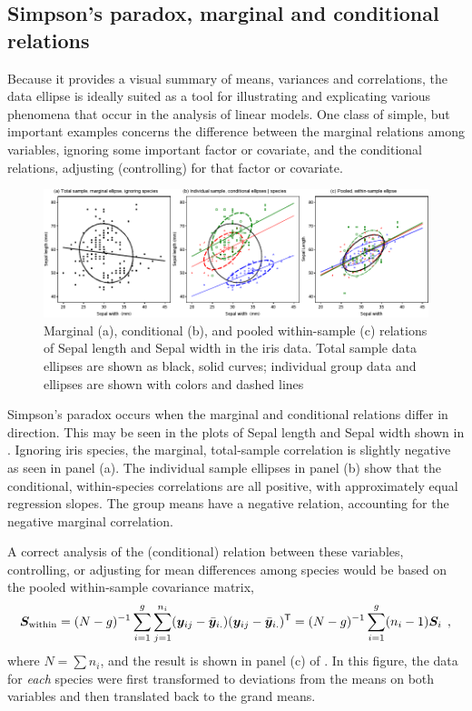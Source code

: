 \subsection{Simpson's paradox, marginal and conditional relations}\label{sec:simpson-iris}
Because it provides a visual summary of means, variances and correlations,
the data ellipse is ideally suited as a tool for illustrating and
explicating various
phenomena that occur in the analysis of linear models.
One class of simple, but important examples concerns the difference between the marginal
relations among variables, ignoring some important factor or covariate,
and the conditional relations, adjusting (controlling) for that
factor or covariate.

\begin{figure}[htb]
  \centering
  \includegraphics[width=\textwidth,clip]{fig/contiris3}
  \caption{Marginal (a), conditional (b), and pooled within-sample (c) relations
  of Sepal length and Sepal width in the iris data. Total sample data ellipses are
  shown as black, solid curves; individual group data and ellipses are shown with
  colors and dashed lines}%
  \label{fig:contiris3}
\end{figure}

Simpson's paradox \citep{Simpson:51} occurs when the marginal and
conditional relations differ in direction. This may be seen in the plots
of Sepal length and Sepal width shown in . Ignoring
iris species, the marginal, total-sample correlation is slightly negative
as seen in panel (a). The individual sample ellipses in panel (b) show
that the conditional, within-species correlations are all positive, with
approximately equal regression slopes.  The group means have a negative
relation, accounting for the negative marginal correlation.

A correct analysis of the (conditional) relation between these variables, controlling, or adjusting for mean
differences among species would be based on the pooled within-sample covariance matrix,
  \begin{equation} \label{eq:Sp}
  \bm{S}_{\textrm{within}}  = (N - g)^{-1}
  \sum_{i=1}^g
  \sum_{j=1}^{n_i}
  ( \bm{y}_{ij}  -  \bar{\bm{y}}_{i.} )
  ( \bm{y}_{ij}  -  \bar{\bm{y}}_{i.} ) ^\mathsf{T}
  =(N - g)^{-1}
  \sum_{i=1}^g
  (n_i - 1) \bm{S}_i
  \:\: ,
  \end{equation}
where $N = \sum n_i$, and the result
is shown in
panel (c) of .
In this figure, the data for \emph{each} species were first
transformed to deviations from the means on both variables
and then translated back to the grand means.

